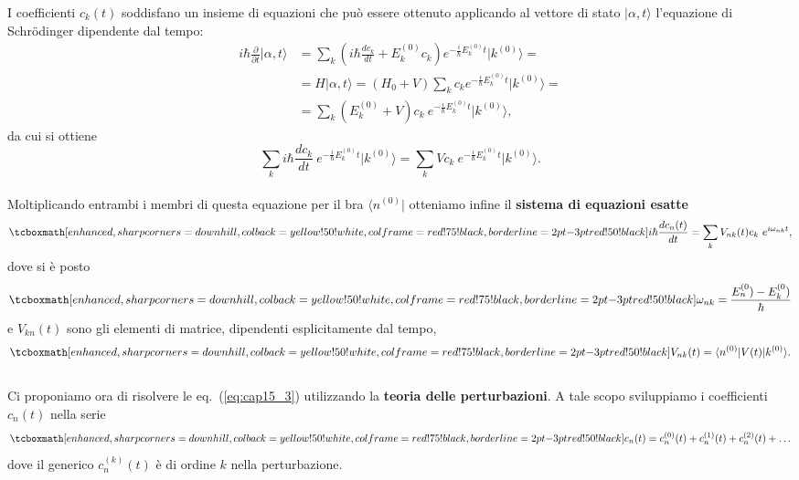 I coefficienti $c_k (t)$ soddisfano un insieme di equazioni che può essere ottenuto applicando al vettore di stato $\vert \alpha , t \rangle $ l'equazione di Schr\"{o}dinger dipendente dal tempo:
	\begin{align}
		i\hbar \frac{\partial}{\partial t} \vert \alpha , t \rangle &= \sum _ k \left( i\hbar \frac{dc_k}{dt}+ E_k ^{(0)} c_k\right)e^{-\frac{i}{\hbar}E_k ^{(0)} t } \vert k ^{(0)} \rangle =\nonumber \\
		&=  H\vert \alpha , t \rangle  = \left( H_0 + V\right)\sum _k c_ke^{-\frac{i}{\hbar}E_k ^{(0)} t } \vert k ^{(0)} \rangle  = \nonumber \\
		&=   \sum _k \left( E_k ^{(0)}+ V\right)c_k\ e^{-\frac{i}{\hbar}E_k ^{(0)} t } \vert k ^{(0)} \rangle ,
	\end{align}
da cui si ottiene
\begin{equation}
\sum _ k i\hbar \frac{dc_k}{dt} \ e^{-\frac{i}{\hbar}E_k ^{(0)} t } \vert k ^{(0)} \rangle = \sum _ k V c_k\ e^{-\frac{i}{\hbar}E_k ^{(0)} t } \vert k ^{(0)} \rangle .
\end{equation}\\

Moltiplicando entrambi i membri di questa equazione per il bra $\langle n^{(0)} \vert$ otteniamo infine il \textbf{sistema di equazioni esatte}
	\begin{equation}
		\tcboxmath[enhanced, sharp corners=downhill, colback=yellow!50!white, colframe=red!75!black, borderline={2pt}{-3pt}{red!50!black}]{
			i\hbar \frac{dc_n (t)}{dt} = \sum _ k V_{nk} (t) c_k\ e^{i\omega _{nk}t } ,
			}
	\label{eq:cap15_3}
	\end{equation}
dove si è posto
	\begin{equation}
		\tcboxmath[enhanced, sharp corners=downhill, colback=yellow!50!white, colframe=red!75!black, borderline={2pt}{-3pt}{red!50!black}]{
			\omega _{nk} = \frac{E_n ^{(0})-E_k ^{(0})}{\hbar}
			}
	\end{equation}
e $V_{kn} (t)$ sono gli elementi di matrice, dipendenti esplicitamente dal tempo,
	\begin{equation}
		\tcboxmath[enhanced, sharp corners=downhill, colback=yellow!50!white, colframe=red!75!black, borderline={2pt}{-3pt}{red!50!black}]{
			V_{nk} (t) = \langle n ^{(0)} \vert V(t) \vert k ^{(0)} \rangle .
			}
	\end{equation}\\
	
Ci proponiamo ora di risolvere le eq.~(\ref{eq:cap15_3}) utilizzando la \textbf{teoria delle perturbazioni}. A tale scopo sviluppiamo i coefficienti $c_n (t)$ nella serie
	\begin{equation}
		\tcboxmath[enhanced, sharp corners=downhill, colback=yellow!50!white, colframe=red!75!black, borderline={2pt}{-3pt}{red!50!black}]{
			c_n (t) = c_n ^{(0)}(t)+c_n ^{(1)}(t)+c_n ^{(2)}(t)+\dots
			}
	\end{equation}
dove il generico $c_n ^{(k)}(t)$ è di ordine $k$ nella perturbazione.\\

